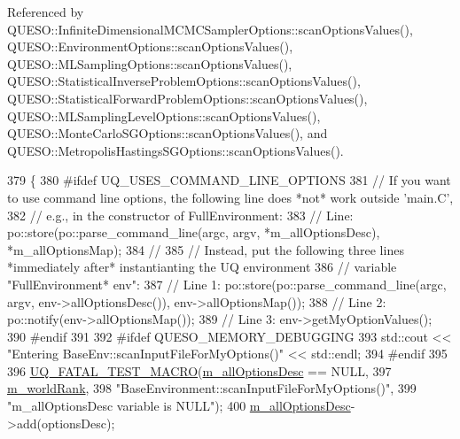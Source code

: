 Referenced by Q\-U\-E\-S\-O\-::\-Infinite\-Dimensional\-M\-C\-M\-C\-Sampler\-Options\-::scan\-Options\-Values(), Q\-U\-E\-S\-O\-::\-Environment\-Options\-::scan\-Options\-Values(), Q\-U\-E\-S\-O\-::\-M\-L\-Sampling\-Options\-::scan\-Options\-Values(), Q\-U\-E\-S\-O\-::\-Statistical\-Inverse\-Problem\-Options\-::scan\-Options\-Values(), Q\-U\-E\-S\-O\-::\-Statistical\-Forward\-Problem\-Options\-::scan\-Options\-Values(), Q\-U\-E\-S\-O\-::\-M\-L\-Sampling\-Level\-Options\-::scan\-Options\-Values(), Q\-U\-E\-S\-O\-::\-Monte\-Carlo\-S\-G\-Options\-::scan\-Options\-Values(), and Q\-U\-E\-S\-O\-::\-Metropolis\-Hastings\-S\-G\-Options\-::scan\-Options\-Values().


\begin{DoxyCode}
379 \{
380 \textcolor{preprocessor}{#ifdef UQ\_USES\_COMMAND\_LINE\_OPTIONS}
381 \textcolor{preprocessor}{}  \textcolor{comment}{// If you want to use command line options, the following line does *not* work outside 'main.C',}
382   \textcolor{comment}{// e.g., in the constructor of FullEnvironment:}
383   \textcolor{comment}{// Line: po::store(po::parse\_command\_line(argc, argv, *m\_allOptionsDesc), *m\_allOptionsMap);}
384   \textcolor{comment}{//}
385   \textcolor{comment}{// Instead, put the following three lines *immediately after* instantianting the UQ environment}
386   \textcolor{comment}{// variable "FullEnvironment* env":}
387   \textcolor{comment}{// Line 1: po::store(po::parse\_command\_line(argc, argv, env->allOptionsDesc()), env->allOptionsMap());}
388   \textcolor{comment}{// Line 2: po::notify(env->allOptionsMap());}
389   \textcolor{comment}{// Line 3: env->getMyOptionValues();}
390 \textcolor{preprocessor}{#endif}
391 \textcolor{preprocessor}{}
392 \textcolor{preprocessor}{#ifdef QUESO\_MEMORY\_DEBUGGING}
393 \textcolor{preprocessor}{}  std::cout << \textcolor{stringliteral}{"Entering BaseEnv::scanInputFileForMyOptions()"} << std::endl;
394 \textcolor{preprocessor}{#endif}
395 \textcolor{preprocessor}{}
396   \hyperlink{_defines_8h_a56d63d18d0a6d45757de47fcc06f574d}{UQ\_FATAL\_TEST\_MACRO}(\hyperlink{class_q_u_e_s_o_1_1_base_environment_aac5465b02be108536bda1b5627456c97}{m\_allOptionsDesc} == NULL,
397                       \hyperlink{class_q_u_e_s_o_1_1_base_environment_a464cab923ada0e14c6e3a4000c2ea385}{m\_worldRank},
398                       \textcolor{stringliteral}{"BaseEnvironment::scanInputFileForMyOptions()"},
399                       \textcolor{stringliteral}{"m\_allOptionsDesc variable is NULL"});
400   \hyperlink{class_q_u_e_s_o_1_1_base_environment_aac5465b02be108536bda1b5627456c97}{m\_allOptionsDesc}->add(optionsDesc);

\end{DoxyCode}
